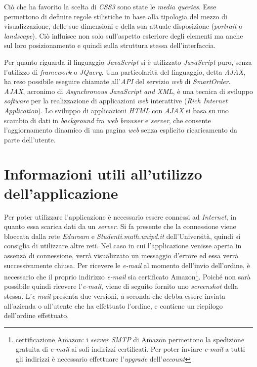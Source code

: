 \documentclass[12pt, a4paper, titlepage]{report}
\begin{document}
	\noindent Ciò che ha favorito la scelta di \textit{CSS3} sono state le \textit{media queries}. Esse permettono di definire regole stilistiche in base alla tipologia del mezzo di visualizzazione, delle sue dimensioni e della sua attuale disposizione (\textit{portrait} o \textit{landscape}). Ciò influisce non solo sull'aspetto esteriore degli elementi ma anche sul loro posizionamento e quindi sulla struttura stessa dell'interfaccia.
	\medskip
	
	\noindent Per quanto riguarda il linguaggio \textit{JavaScript} si è utilizzato \textit{JavaScript} puro, senza l'utilizzo di \textit{framework} o \textit{JQuery}. Una particolarità del linguaggio, detta \textit{AJAX}, ha reso possibile eseguire chiamate all'\textit{API} del servizio \textit{web} di \textit{SmartOrder}. \textit{AJAX}, acronimo di \textit{\textit{Asynchronous JavaScript and XML}}, è una tecnica di sviluppo \textit{software} per la realizzazione di applicazioni \textit{web} interattive (\textit{Rich Internet Application}). Lo sviluppo di applicazioni \textit{HTML} con \textit{AJAX} si basa su uno scambio di dati in \textit{background} fra \textit{web browser} e \textit{server}, che consente l'aggiornamento dinamico di una pagina \textit{web} senza esplicito ricaricamento da parte dell'utente.
		
	\section{Informazioni utili all'utilizzo dell'applicazione}
	
	Per poter utilizzare l'applicazione è necessario essere connessi ad \textit{Internet}, in quanto essa scarica dati da un \textit{server}. Si fa presente che la connessione viene bloccata dalla rete \textit{Eduroam} e \textit{Studenti.math.unipd.it} dell'Università, quindi si consiglia di utilizzare altre reti. Nel caso in cui l'applicazione venisse aperta in assenza di connessione, verrà visualizzato un messaggio d'errore ed essa verrà successivamente chiusa. Per ricevere le \textit{e-mail} al momento dell'invio dell'ordine, è necessario che il proprio indirizzo \textit{e-mail} sia certificato Amazon\footnote{certificazione Amazon: i \textit{server SMTP} di Amazon permettono la spedizione gratuita di \textit{e-mail} ai soli indirizzi certificati. Per poter inviare \textit{e-mail} a tutti gli indirizzi è necessario effettuare l'\textit{upgrade} dell'\textit{account}}. Poiché non sarà possibile quindi ricevere l'\textit{e-mail}, viene di seguito fornito uno \textit{screenshot} della stessa. L'\textit{e-mail} presenta due versioni, a seconda che debba essere inviata all'azienda o all'utente che ha effettuato l'ordine, e contiene un riepilogo dell'ordine effettuato.
	
\end{document}
